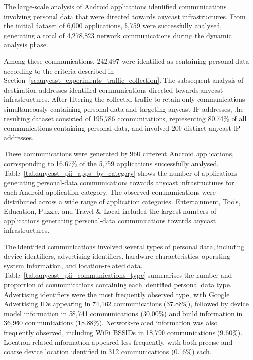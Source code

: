 \documentclass[
A4paper,                %
twoside,                %
openright,              %
chapterprefix=true,     %
12pt,                   %
headings=normal,        %
titlepage=on            %
]{book}
\begin{document}
The large-scale analysis of Android applications identified communications involving personal data that were directed towards anycast infrastructures. From the initial dataset of 6,000 applications, 5,759 were successfully analysed, generating a total of 4,278,823 network communications during the dynamic analysis phase.

Among these communications, 242,497 were identified as containing personal data according to the criteria described in Section~\ref{sc:anycast_experiments_traffic_collection}. The subsequent analysis of destination addresses identified communications directed towards anycast infrastructures. After filtering the collected traffic to retain only communications simultaneously containing personal data and targeting anycast IP addresses, the resulting dataset consisted of 195,786 communications, representing 80.74\% of all communications containing personal data, and involved 200 distinct anycast IP addresses.

These communications were generated by 960 different Android applications, corresponding to 16.67\% of the 5,759 applications successfully analysed. Table~\ref{tab:anycast_pii_apps_by_category} shows the number of applications generating personal-data communications towards anycast infrastructures for each Android application category. The observed communications were distributed across a wide range of application categories. Entertainment, Tools, Education, Puzzle, and Travel \& Local included the largest numbers of applications generating personal-data communications towards anycast infrastructures.

The identified communications involved several types of personal data, including device identifiers, advertising identifiers, hardware characteristics, operating system information, and location-related data. Table~\ref{tab:anycast_pii_communications_type} summarises the number and proportion of communications containing each identified personal data type. Advertising identifiers were the most frequently observed type, with Google Advertising IDs appearing in 74,162 communications (37.88\%), followed by device model information in 58,741 communications (30.00\%) and build information in 36,960 communications (18.88\%). Network-related information was also frequently observed, including WiFi BSSIDs in 18,790 communications (9.60\%). Location-related information appeared less frequently, with both precise and coarse device location identified in 312 communications (0.16\%) each.
\end{document}
